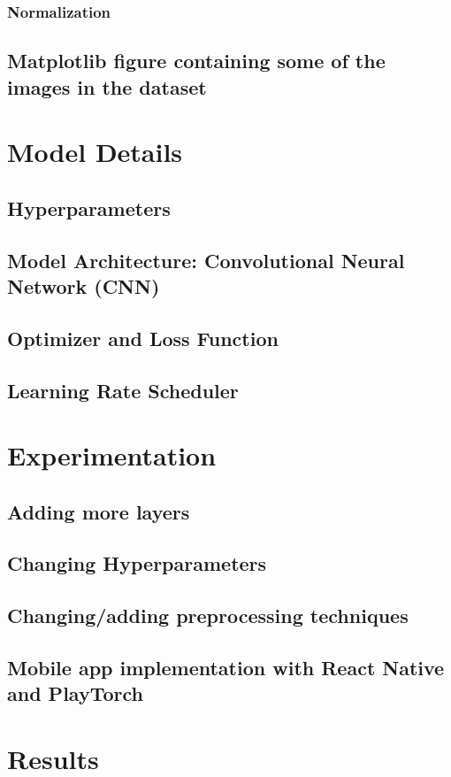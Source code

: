 \documentclass[a4paper,oneside,11pt]{book}
\begin{document}
\subsection{Normalization}
\section{Matplotlib figure containing some of the images in the dataset}

\chapter{Model Details}
\section{Hyperparameters}
\section{Model Architecture: Convolutional Neural Network (CNN)}
\section{Optimizer and Loss Function}
\section{Learning Rate Scheduler}


\chapter{Experimentation}
\section{Adding more layers}
\section{Changing Hyperparameters}
\section{Changing/adding preprocessing techniques}
\section{Mobile app implementation with React Native and PlayTorch}

\chapter{Results}
\end{document}
